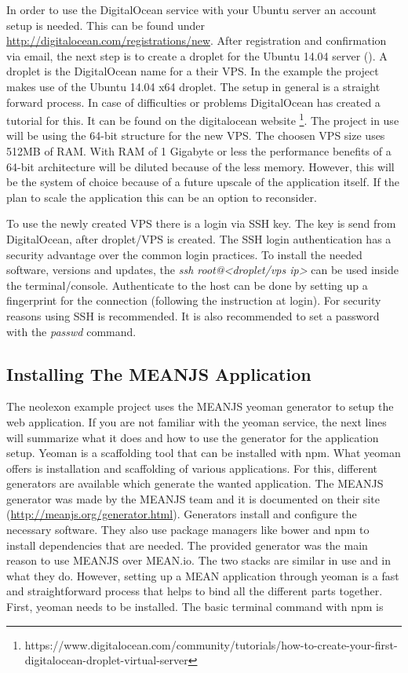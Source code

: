In order to use the DigitalOcean service with your Ubuntu server an account setup is needed. This can be found under \url{http://digitalocean.com/registrations/new}. After
registration and confirmation via email, the next step is to create a droplet for the Ubuntu 14.04 server (\cite{droplet}). A droplet is the DigitalOcean name for a their VPS.
In the example the project makes use of the Ubuntu 14.04 x64 droplet. The setup in general is a straight forward process. In case of difficulties or problems DigitalOcean has
created a tutorial for this. It can be found on the digitalocean website \footnote{https://www.digitalocean.com/community/tutorials/how-to-create-your-first-digitalocean-droplet-virtual-server}.
The project in use will be using the 64-bit structure for the new VPS. The choosen VPS size uses 512MB of RAM. With RAM of 1 Gigabyte or less the performance benefits of a 64-bit
architecture will be diluted because of the less memory. However, this will be the system of choice because of a future upscale of the application itself. If the plan
to scale the application this can be an option to reconsider.

To use the newly created VPS there is a login via SSH key. The key is send from DigitalOcean, after droplet/VPS is created. The SSH login authentication has a security
advantage over the common login practices. To install the needed software, versions and updates, the \textit{ssh root@<droplet/vps ip>} can be used inside the
terminal/console. Authenticate to the host can be done by setting up a fingerprint for the connection (following the instruction at login). For security reasons
using SSH is recommended. It is also recommended to set a password with the \textit{passwd} command.

\subsection{Installing The MEANJS Application}
The neolexon example project uses the MEANJS yeoman generator to setup the web application. If you are not familiar with the yeoman service, the next lines
will summarize what it does and how to use the generator for the application setup. Yeoman is a scaffolding tool that can be installed with npm. What yeoman offers is
installation and scaffolding of various applications. For this, different generators are available which generate the wanted application. The MEANJS generator
was made by the MEANJS team and it is documented on their site (\url{http://meanjs.org/generator.html}). Generators install and configure the necessary software.
They also use package managers like bower and npm to install dependencies that are needed. The provided generator was the main reason to use MEANJS over MEAN.io.
The two stacks are similar in use and in what they do. However, setting up a MEAN application through yeoman is a fast and straightforward process that helps to bind all
the different parts together. First, yeoman needs to be installed. The basic terminal command with npm is

